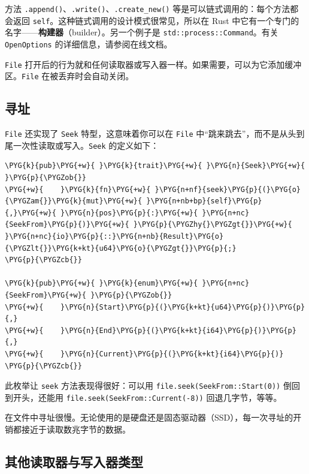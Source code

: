 方法 \texttt{.append()}、\texttt{.write()}、\texttt{.create\_new()} 等是可以链式调用的：每个方法都会返回 \texttt{self}。这种链式调用的设计模式很常见，所以在 Rust 中它有一个专门的名字——\textbf{构建器}（builder）。另一个例子是 \texttt{std::process::Command}。有关 \texttt{OpenOptions} 的详细信息，请参阅在线文档。

\texttt{File} 打开后的行为就和任何读取器或写入器一样。如果需要，可以为它添加缓冲区。\texttt{File} 在被丢弃时会自动关闭。

\subsection{寻址}

\texttt{File} 还实现了 \texttt{Seek} 特型，这意味着你可以在 \texttt{File} 中“跳来跳去”，而不是从头到尾一次性读取或写入。\texttt{Seek} 的定义如下：

\begin{Verbatim}[commandchars=\\\{\},breaklines=true,breakanywhere=true,fontsize=\codefont,xleftmargin=17bp]
\PYG{k}{pub}\PYG{+w}{ }\PYG{k}{trait}\PYG{+w}{ }\PYG{n}{Seek}\PYG{+w}{ }\PYG{p}{\PYGZob{}}
\PYG{+w}{    }\PYG{k}{fn}\PYG{+w}{ }\PYG{n+nf}{seek}\PYG{p}{(}\PYG{o}{\PYGZam{}}\PYG{k}{mut}\PYG{+w}{ }\PYG{n+nb+bp}{self}\PYG{p}{,}\PYG{+w}{ }\PYG{n}{pos}\PYG{p}{:}\PYG{+w}{ }\PYG{n+nc}{SeekFrom}\PYG{p}{)}\PYG{+w}{ }\PYG{p}{\PYGZhy{}\PYGZgt{}}\PYG{+w}{ }\PYG{n+nc}{io}\PYG{p}{::}\PYG{n+nb}{Result}\PYG{o}{\PYGZlt{}}\PYG{k+kt}{u64}\PYG{o}{\PYGZgt{}}\PYG{p}{;}
\PYG{p}{\PYGZcb{}}

\PYG{k}{pub}\PYG{+w}{ }\PYG{k}{enum}\PYG{+w}{ }\PYG{n+nc}{SeekFrom}\PYG{+w}{ }\PYG{p}{\PYGZob{}}
\PYG{+w}{    }\PYG{n}{Start}\PYG{p}{(}\PYG{k+kt}{u64}\PYG{p}{)}\PYG{p}{,}
\PYG{+w}{    }\PYG{n}{End}\PYG{p}{(}\PYG{k+kt}{i64}\PYG{p}{)}\PYG{p}{,}
\PYG{+w}{    }\PYG{n}{Current}\PYG{p}{(}\PYG{k+kt}{i64}\PYG{p}{)}
\PYG{p}{\PYGZcb{}}
\end{Verbatim}

此枚举让 \texttt{seek} 方法表现得很好：可以用 \texttt{file.seek(SeekFrom::Start(0))} 倒回到开头，还能用 \texttt{file.seek(SeekFrom::Current(-8))} 回退几字节，等等。

在文件中寻址很慢。无论使用的是硬盘还是固态驱动器（SSD），每一次寻址的开销都接近于读取数兆字节的数据。

\subsection{其他读取器与写入器类型}

